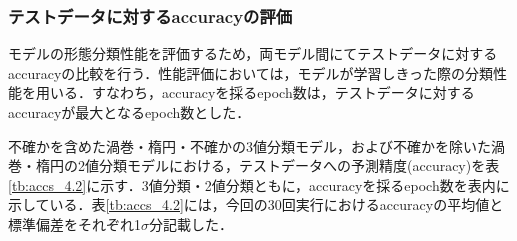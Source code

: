 \documentclass[a4j, 11pt]{jreport}
\begin{document}





\subsubsection{テストデータに対するaccuracyの評価}
モデルの形態分類性能を評価するため，両モデル間にてテストデータに対するaccuracyの比較を行う．性能評価においては，モデルが学習しきった際の分類性能を用いる．すなわち，accuracyを採るepoch数は，テストデータに対するaccuracyが最大となるepoch数とした．

不確かを含めた渦巻・楕円・不確かの3値分類モデル，および不確かを除いた渦巻・楕円の2値分類モデルにおける，テストデータへの予測精度(accuracy)を表\ref{tb:accs_4.2}に示す．3値分類・2値分類ともに，accuracyを採るepoch数を表内に示している．表\ref{tb:accs_4.2}には，今回の30回実行におけるaccuracyの平均値と標準偏差をそれぞれ1$\sigma$分記載した．
\end{document}
